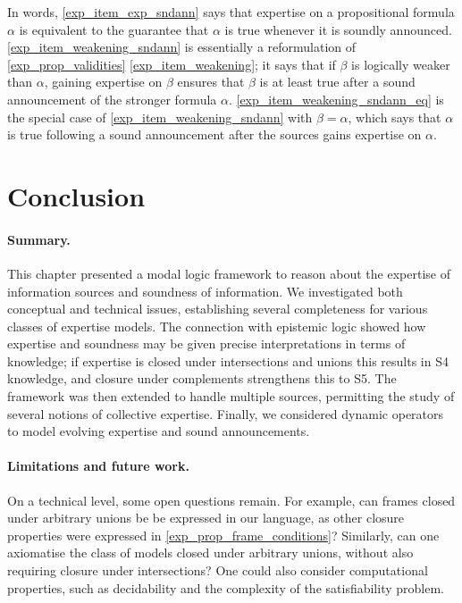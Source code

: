 In words, \cref{exp_item_exp_sndann} says that expertise on a propositional
formula $\alpha$ is equivalent to the guarantee that $\alpha$ is true whenever
it is soundly announced. \cref{exp_item_weakening_sndann} is essentially a
reformulation of \cref{exp_prop_validities} \cref{exp_item_weakening}; it says that
if $\beta$ is logically weaker than $\alpha$, gaining expertise on $\beta$
ensures that $\beta$ is at least true after a sound announcement of the
stronger formula $\alpha$.  \cref{exp_item_weakening_sndann_eq} is the special
case of \cref{exp_item_weakening_sndann} with $\beta = \alpha$, which says that
$\alpha$ is true following a sound announcement after the sources gains
expertise on $\alpha$.

\section{Conclusion}
\label{exp_sec_conclusion}

\paragraph{Summary.} This chapter presented a modal logic framework to
reason about the expertise of information sources and soundness of information.
We investigated both conceptual and technical issues, establishing several
completeness for various classes of expertise models. The connection with
epistemic logic showed how expertise and soundness may be given precise
interpretations in terms of knowledge; if expertise is closed under
intersections and unions this results in S4 knowledge, and closure under
complements strengthens this to S5. The framework was then extended to handle
multiple sources, permitting the study of several notions of collective
expertise. Finally, we considered dynamic operators to model evolving expertise
and sound announcements.

\paragraph{Limitations and future work.}

On a technical level, some open questions remain. For example, can frames
closed under arbitrary unions be be expressed in our language, as other closure
properties were expressed in \cref{exp_prop_frame_conditions}? Similarly, can
one axiomatise the class of models closed under arbitrary unions, without also
requiring closure under intersections? One could also consider computational
properties, such as decidability and the complexity of the satisfiability
problem.

